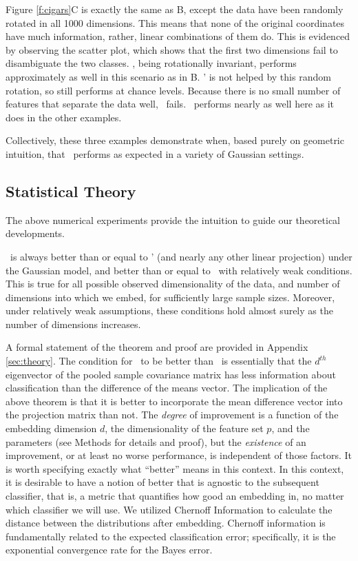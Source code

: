 \documentclass[10pt]{article}
\begin{document}
Figure \ref{f:cigars}{\color{magenta}C}  is exactly the same as B, except the data have been randomly rotated in all 1000 dimensions.  This means that none of the original coordinates have much information, rather, linear combinations of them do.
This is evidenced by observing the scatter plot, which shows that the first two dimensions  fail to disambiguate the two classes.
\Pca, being rotationally invariant, performs approximately as well in this scenario as in B.
\Pca' is not helped by this random rotation, so still performs at chance levels.
Because there is no small number of features that separate the data well,  \Road~fails.
 \Lol~performs nearly as well here as it does in the other examples.
 
 Collectively, these three examples demonstrate when, based purely on geometric intuition, that \Lol~performs as expected in a variety of Gaussian settings.


\subsection*{Statistical Theory}

The above numerical experiments provide the intuition to guide our theoretical developments. 
\begin{thm} \label{t:LDA}
\Lol~is always better than or equal to \Pca' (and nearly any other linear projection) under the Gaussian model, and better than or equal to \Pca~with relatively weak conditions.  This is true for all possible observed dimensionality of the data, and number of dimensions into which we embed, for sufficiently large sample sizes. Moreover, under relatively weak assumptions, these conditions hold almost surely as the number of dimensions increases.
\end{thm}
A formal statement of the theorem and proof are provided in Appendix \ref{sec:theory}.  The condition for \Lol~to be better than \Pca~is essentially that the $d^{th}$ eigenvector of the pooled sample covariance matrix has less information about classification than the difference of the means vector.  
%
The implication of the above theorem is that it is better to incorporate the mean difference vector into the projection matrix than not.  The \emph{degree} of improvement is a function of the embedding dimension $d$, the  dimensionality of the feature set $p$, and the parameters (see Methods for details and proof), but the \emph{existence} of an improvement, or at least no worse performance, is independent of those factors.  It is worth specifying exactly what ``better'' means in this context.  
In this context, it is desirable to have a notion of better that  is agnostic to the subsequent classifier, that is, a metric that  quantifies how good an embedding in, no matter which classifier we will use.  We utilized Chernoff Information to calculate the distance between the distributions after embedding. Chernoff information  is fundamentally related to the expected classification error;  specifically, it is the exponential convergence rate for the Bayes error. 
\end{document}
